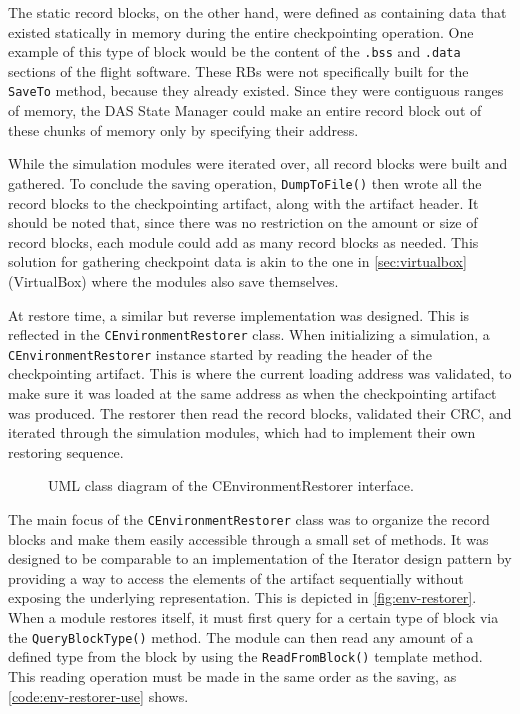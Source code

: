 {The static record blocks, on the other hand, were defined as containing data that existed statically in memory during the entire checkpointing operation. One example of this type of block would be the content of the \texttt{.bss} and \texttt{.data} sections of the flight software. These RBs were not specifically built for the \texttt{SaveTo} method, because they already existed. Since they were contiguous ranges of memory, the DAS State Manager could make an entire record block out of these chunks of memory only by specifying their address. 

While the simulation modules were iterated over, all record blocks were built and gathered. To conclude the saving operation, \texttt{DumpToFile()} then wrote all the record blocks to the checkpointing artifact, along with the artifact header. It should be noted that, since there was no restriction on the amount or size of record blocks, each module could add as many record blocks as needed. This solution for gathering checkpoint data is akin to the one in \autoref{sec:virtualbox} (VirtualBox) where the modules also save themselves.

At restore time, a similar but reverse implementation was designed. This is reflected in the \texttt{CEnvironmentRestorer} class. When initializing a simulation, a \texttt{CEnvironmentRestorer} instance started by reading the header of the checkpointing artifact. This is where the current  loading address was validated, to make sure it was loaded at the same address as when the checkpointing artifact was produced. The restorer then read the record blocks, validated their CRC, and iterated through the simulation modules, which had to implement their own restoring sequence.

\begin{figure}[htbp]
	\centering
	\vspace{12pt}
	\footnotesize
	
	\caption{UML class diagram of the CEnvironmentRestorer interface.}
	\label{fig:env-restorer}
\end{figure}

The main focus of the \texttt{CEnvironmentRestorer} class was to organize the record blocks and make them easily accessible through a small set of methods. It was designed to be comparable to an implementation of the Iterator design pattern by providing a way to access the elements of the artifact sequentially without exposing the underlying representation\cite{misc:iterator-des-pat}. This is depicted in \autoref{fig:env-restorer}. When a module restores itself, it must first query for a certain type of block via the \texttt{QueryBlockType()} method. The module can then read any amount of a defined type from the block by using the \texttt{ReadFromBlock()} template method. This reading operation must be made in the same order as the saving, as \autoref{code:env-restorer-use} shows.

}
